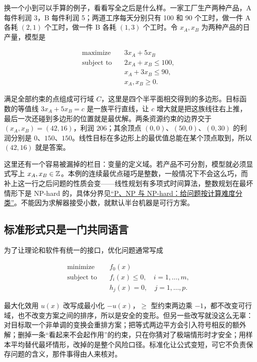 换一个小到可以手算的例子，看看写全之后是什么样。一家工厂生产两种产品，A 每件利润 3，B 每件利润 5；两道工序每天分别只有 100 和 90 个工时，做一件 A 各耗 \((2,1)\) 个工时，做一件 B 各耗 \((1,3)\) 个工时。令 \(x_A,x_B\) 为两种产品的日产量，模型是

\[
\begin{aligned}
\text{maximize}\quad &3x_A+5x_B\\
\text{subject to}\quad
&2x_A+x_B\le100,\\
&x_A+3x_B\le90,\\
&x_A,x_B\ge0.
\end{aligned}
\]

满足全部约束的点组成可行域 \(C\)，这里是四个半平面相交得到的多边形。目标函数的等值线 \(3x_A+5x_B=c\) 是一族平行直线，让 \(c\) 增大就是把这族线往右上推，最后一次还碰到多边形的位置就是最优解。两条资源约束的边界交于 \((x_A,x_B)=(42,16)\)，利润 \(206\)；其余顶点 \((0,0)\)、\((50,0)\)、\((0,30)\) 的利润分别是 \(0\)、\(150\)、\(150\)。线性目标在多边形上的最优值总能在某个顶点取到，所以 \((42,16)\) 就是答案。

这里还有一个容易被漏掉的栏目：变量的定义域。若产品不可分割，模型就必须显式写上 \(x_A,x_B\in\mathbb{Z}\)。本例的连续最优点碰巧是整数，一般情况下不会这么巧，而补上这一行之后问题的性质会变——线性规划有多项式时间算法，整数规划在最坏情形下是 NP-hard 的，具体分界见\hyperref[sec:09-Convex-Optimization/09-Complexity-and-Approximation/01]{``P、NP 与 NP-hard：给问题按计算难度分类''}。不能因为求解器接受小数，就默认半台机器是可行方案。

\subsection{标准形式只是一门共同语言}

为了让理论和软件有统一的接口，优化问题通常写成

\[
\begin{aligned}
\text{minimize}\quad & f_0(x)\\
\text{subject to}\quad
& f_i(x)\le0,\quad i=1,\ldots,m,\\
& h_j(x)=0,\quad j=1,\ldots,p.
\end{aligned}
\]

最大化效用 \(u(x)\) 改写成最小化 \(-u(x)\)，\(\ge\) 型约束两边乘 \(-1\)，都不改变可行域，也不改变方案之间的排序，所以是安全的变形。但另一些改写就没这么无辜：对目标取一个非单调的变换会重排方案；把等式两边平方会引入符号相反的额外解；删掉一条``看起来不会起作用''的约束，只在你猜对了极端情形时才安全；用样本平均替代最坏情形，改掉的是整个风险口径。标准化让公式变短，可它不负责保存问题的含义，那件事得由人来核对。

